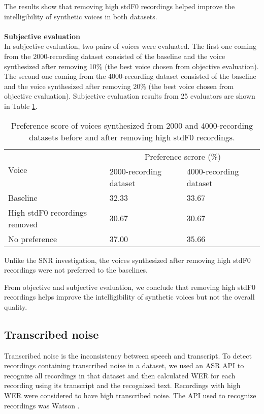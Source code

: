 \documentclass[12pt]{article}
\begin{document}
The results show that removing high stdF0 recordings helped improve the intelligibility of synthetic voices in both datasets.\\\\
\textbf{Subjective evaluation}
\vspace{0.28cm}\\
In subjective evaluation, two pairs of voices were evaluated. The first one coming from the 2000-recording dataset consisted of the baseline and the voice synthesized after removing 10\% (the best voice chosen from objective evaluation). The second one coming from the 4000-recording dataset consisted of the baseline and the voice synthesized after removing 20\% (the best voice chosen from objective evaluation). Subjective evaluation results from 25 evaluators are shown in Table \ref{tab_subEvaStsF0}.

\begin{table}[]
\begin{center}
\caption{Preference score of voices synthesized from 2000 and 4000-recording datasets before and after removing high stdF0 recordings.}
\label{tab_subEvaStsF0}
\vspace{3mm}
\begin{tabular}{|l|m{2.8cm}|m{2.8cm}|}
\hline
\multirow{2}{4cm}{Voice} &
\multicolumn{2}{c|}{Preference scrore (\%)} \\ \cline{2-3}
& 2000-recording dataset & 4000-recording dataset \\
\hline
Baseline                      & 32.33 & 33.67 \\
High stdF0 recordings removed & 30.67 & 30.67 \\
No preference                 & 37.00 & 35.66 \\
\hline
\end{tabular}
\end{center}
\end{table}

Unlike the SNR investigation, the voices synthesized after removing high stdF0 recordings were not preferred to the baselines.

From objective and subjective evaluation, we conclude that removing high stdF0 recordings helps improve the intelligibility of synthetic voices but not the overall quality.

\subsection{Transcribed noise}
Transcribed noise is the inconsistency between speech and transcript. To detect recordings containing transcribed noise in a dataset, we used an ASR API to recognize all recordings in that dataset and then calculated WER for each recording using its transcript and the recognized text. Recordings with high WER were considered to have high transcribed noise. The API used to recognize recordings was Watson \cite{watson}.
\end{document}

